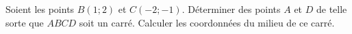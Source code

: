 
\begin{exercice}\label{exosmath-0486}

    Soient les points \( B(1;2)\) et \( C(-2;-1)\). Déterminer des points \( A\) et \( D\) de telle sorte que \( ABCD\) soit un carré. Calculer les coordonnées du milieu de ce carré. 

\end{exercice}
